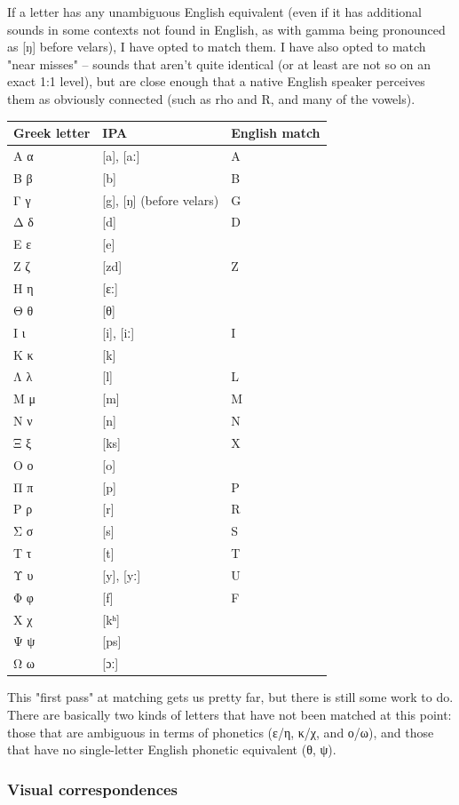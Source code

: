 \documentclass[11pt]{article}
\begin{document}
If a letter has any unambiguous English equivalent (even if it has additional sounds in some contexts not found in English, as with gamma being pronounced as [ŋ] before velars), I have opted to match them. I have also opted to match "near misses" -- sounds that aren't quite identical (or at least are not so on an exact 1:1 level), but are close enough that a native English speaker perceives them as obviously connected (such as rho and R, and many of the vowels).

\begin{center}
\begin{tabular}{lll}
Greek letter & IPA & English match\\
\hline
Α α & [a], [aː] & A\\
Β β & [b] & B\\
Γ γ & [g], [ŋ] (before velars) & G\\
Δ δ & [d] & D\\
Ε ε & [e] & \\
Ζ ζ & [zd] & Z\\
Η η & [ɛː] & \\
Θ θ & [θ] & \\
Ι ι & [i], [iː] & I\\
Κ κ & [k] & \\
Λ λ & [l] & L\\
Μ μ & [m] & M\\
Ν ν & [n] & N\\
Ξ ξ & [ks] & X\\
Ο ο & [o] & \\
Π π & [p] & P\\
Ρ ρ & [r] & R\\
Σ σ & [s] & S\\
Τ τ & [t] & T\\
Υ υ & [y], [yː] & U\\
Φ φ & [f] & F\\
Χ χ & [kʰ] & \\
Ψ ψ & [ps] & \\
Ω ω & [ɔː] & \\
\end{tabular}
\end{center}

This "first pass" at matching gets us pretty far, but there is still some work to do. There are basically two kinds of letters that have not been matched at this point: those that are ambiguous in terms of phonetics (ε/η, κ/χ, and ο/ω), and those that have no single-letter English phonetic equivalent (θ, ψ).

\subsubsection{Visual correspondences}
\label{sec:org1becf19}
\end{document}
